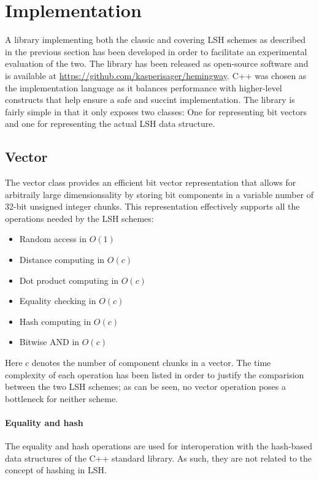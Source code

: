 \section{Implementation}
\label{implementation}

A library implementing both the classic and covering LSH schemes as described in the previous section has been developed in order to facilitate an experimental evaluation of the two. The library has been released as open-source software and is available at \url{https://github.com/kasperisager/hemingway}. C++ was chosen as the implementation language as it balances performance with higher-level constructs that help ensure a safe and succint implementation. The library is fairly simple in that it only exposes two classes: One for representing bit vectors and one for representing the actual LSH data structure.

\subsection{Vector}

The vector class provides an efficient bit vector representation that allows for arbitraily large dimensionsality by storing bit components in a variable number of 32-bit unsigned integer chunks. This representation effectively supports all the operations needed by the LSH schemes:

\begin{itemize}
  \item Random access in $O(1)$
  \item Distance computing in $O(c)$
  \item Dot product computing in $O(c)$
  \item Equality checking in $O(c)$
  \item Hash computing in $O(c)$
  \item Bitwise AND in $O(c)$
\end{itemize}

Here $c$ denotes the number of component chunks in a vector. The time complexity of each operation has been listed in order to justify the comparision between the two LSH schemes; as can be seen, no vector operation poses a bottleneck for neither scheme.

\paragraph{Equality and hash} The equality and hash operations are used for interoperation with the hash-based data structures of the C++ standard library. As such, they are not related to the concept of hashing in LSH.

